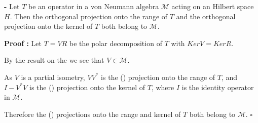 \documentclass[12pt]{article}
\begin{document}
{\bf {} -} Let $T$ be an operator in a von Neumann algebra $\mathcal{M}$ acting on an Hilbert space $H$. Then the orthogonal projection onto the range of $T$ and the orthogonal projection onto the kernel of $T$ both belong to $\mathcal{M}$.

{\bf Proof :} Let $T=VR$ be the polar decomposition of $T$ with $KerV=KerR$.

By the result on the  we see that $V \in \mathcal{M}$.

As $V$ is a partial isometry, $VV^*$ is the () projection onto the range of $T$, and $I-V^*V$ is the () projection onto the kernel of $T$, where $I$ is the identity operator in $\mathcal{M}$.

Therefore the () projections onto the range and kernel of $T$ both belong to $\mathcal{M}$. $\square$
\end{document}
